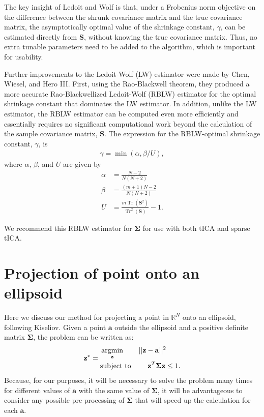 \documentclass[aip, jcp, reprint, nolinenumbers, twocolumn, nobalancelastpage, nofootinbib]{revtex4-1}
\newcommand{\argmin}{\operatornamewithlimits{argmin}}
\DeclareMathOperator{\Tr}{Tr}
\begin{document}
The key insight of Ledoit and Wolf is that, under a Frobenius norm objective on the difference between the shrunk covariance matrix and the true covariance matrix, the asymptotically optimal value of the shrinkage constant, $\gamma$, can be estimated directly from $\mathbf{S}$, without knowing the true covariance matrix. Thus, no extra tunable parameters need to be added to the algorithm, which is important for usability.

Further improvements to the Ledoit-Wolf (LW) estimator  were made by Chen, Wiesel, and Hero III.\cite{chen2009shrinkage} First, using the Rao-Blackwell theorem,\cite{casella1996rao} they produced a more accurate Rao-Blackwellized Ledoit-Wolf (RBLW) estimator for the optimal shrinkage constant that dominates the LW estimator. In addition, unlike the LW estimator, the RBLW estimator can be computed even more efficiently and essentially requires no significant computational work beyond the calculation of the sample covariance matrix, $\mathbf{S}$. The expression for the RBLW-optimal shrinkage constant, $\gamma$, is
\begin{align}
    \gamma = \min(\alpha, \beta/U),
\end{align}
where $\alpha$, $\beta$, and $U$ are given by
\begin{align}
    \alpha &= \frac{N-2}{N(N+2)} \\
    \beta &= \frac{(m+1)N - 2}{N(N+2)} \\
    U &= \frac{m\Tr(\mathbf{S}^2)}{\Tr^2(\mathbf{S})} - 1.
\end{align}

We recommend this RBLW estimator for $\mathbf{\Sigma}$ for use with both tICA and sparse tICA.

\section{Projection of point onto an ellipsoid}
\label{appendix:projection}

Here we discuss our method for projecting a point in $\mathbb{R}^N$ onto an ellipsoid, following Kiseliov.\cite{kiseliov1994algorithms} Given a point $\mathbf{a}$ outside the ellipsoid and a positive definite matrix $\mathbf{\Sigma}$, the problem can be written as:
\begin{align}
\label{appendix:eq:ellipsoid}
\mathbf{z}^* = \begin{aligned}
&\argmin_\mathbf{z}\hspace{2em} ||\mathbf{z}-\mathbf{a}||^2 \\
&\text{subject to }\hspace{2em} \mathbf{z}^T \mathbf{\Sigma} \mathbf{z} \leq 1.\end{aligned}
\end{align}
Because, for our purposes, it will be necessary to solve the problem many times for different values of $\mathbf{a}$ with the same value of $\mathbf{\Sigma}$, it will be advantageous to consider any possible pre-processing of $\mathbf{\Sigma}$ that will speed up the calculation for each $\mathbf{a}$.
\end{document}
